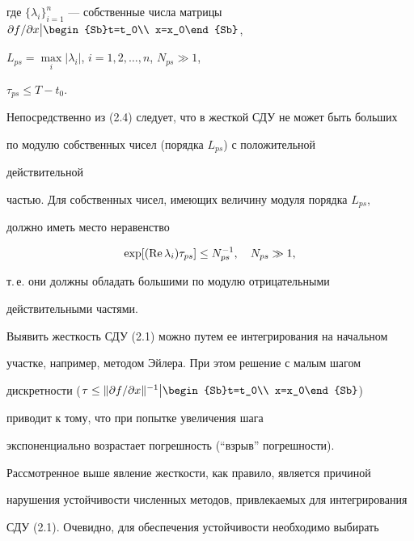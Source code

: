 где $\{\lambda_i\}^n_{i=1}$ --- собственные числа матрицы $\partial 


f/\partial x\big|\begin{Sb}t=t_0\\ x=x_0\end{Sb}$, 


$L_{ps}=\max\limits_i|\lambda_i|$, $i=1,2,\dotsc,n$, $N_{ps}\gg1$, 


$\tau_{ps}\le T-t_0$. 


 


Непосредственно из (2.4) следует, что в жесткой СДУ не может быть больших 


по модулю собственных чисел (порядка $L_{ps}$) с положительной 


действительной 


частью. Для собственных чисел, имеющих величину модуля порядка $L_{ps}$, 


должно иметь место неравенство 


$$ 


\exp[(\re\lambda_i)\tau_{ps}]\le N^{-1}_{ps},\quad 


N_{ps}\gg1, 


$$ 


т.\,е. они должны обладать большими по модулю отрицательными 


действительными частями. 


 


Выявить жесткость СДУ (2.1) можно путем ее интегрирования на начальном 


участке, например, методом Эйлера. При этом решение с малым шагом 


дискретности ($\tau\le\|\partial f/\partial x\|^{-1} 


\big|\begin{Sb}t=t_0\\ x=x_0\end{Sb}$) 


приводит к тому, что при попытке увеличения шага 


экспоненциально возрастает погрешность (``взрыв'' погрешности). 


 


Рассмотренное выше явление жесткости, как правило, является причиной 


нарушения устойчивости численных методов, привлекаемых для интегрирования 


СДУ (2.1). Очевидно, для обеспечения устойчивости необходимо выбирать 


